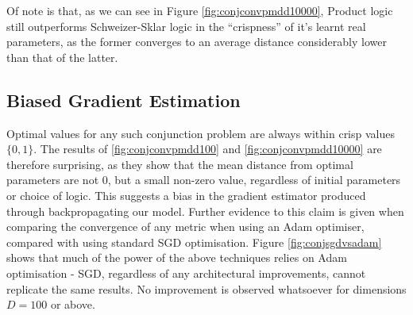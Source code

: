 Of note is that, as we can see in Figure \ref{fig:conjconvpmdd10000}, Product logic still outperforms Schweizer-Sklar logic in the ``crispness'' of it's learnt real parameters, as the former converges to an average distance considerably lower than that of the latter. 

\subsection{Biased Gradient Estimation}

Optimal values for any such conjunction problem are always within crisp values $\{0,1\}$. The results of \ref{fig:conjconvpmdd100} and \ref{fig:conjconvpmdd10000} are therefore surprising, as they show that the mean distance from optimal parameters are not 0, but a small non-zero value, regardless of initial parameters or choice of logic. This suggests a bias in the gradient estimator produced through backpropagating our model. Further evidence to this claim is given when comparing the convergence of any metric when using an Adam optimiser, compared with using standard SGD optimisation. Figure \ref{fig:conjsgdvsadam} shows that much of the power of the above techniques relies on Adam optimisation - SGD, regardless of any architectural improvements, cannot replicate the same results. No improvement is observed whatsoever for dimensions $D=100$ or above.



